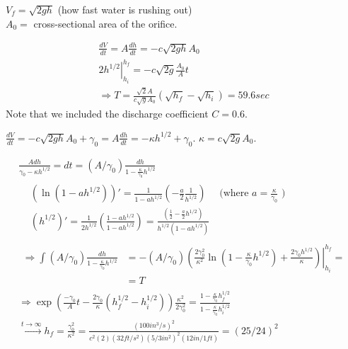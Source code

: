 \documentclass[twoside]{amsart}
\theoremstyle{plain}
\theoremstyle{definition}
\newcommand{\exercisehead}[1]
  {\smallskip
   \noindent{\small\bf Exercise #1.}}
\begin{document}
$V_f = \sqrt{ 2gh }$ (how fast water is rushing out) \medskip \\
$ A_0 = $ cross-sectional area of the orifice.  

\[
\begin{gathered}
  \frac{dV}{dt} = A \frac{dh}{dt} = -c\sqrt{ 2g h } A_0 \\
  \left. 2h^{1/2} \right|_{h_i}^{h_f} = -c\sqrt{ 2g } \frac{A_0}{A} t \\
  \Longrightarrow T = \frac{ \sqrt{2} A}{ c \sqrt{ g} A_0 } \left( \sqrt{ h_f} - \sqrt{ h_i} \right) = 59.6 sec
\end{gathered}
\]
Note that we included the discharge coefficient $C=0.6$.  

\exercisehead{19} $\frac{dV}{dt} = -c\sqrt{ 2gh} A_0 + \gamma_0 = A \frac{dh}{dt} = -\kappa h^{1/2} + \gamma_0$.   $\kappa = c \sqrt{2g} A_0$.  

\[
\begin{gathered}
\frac{ A dh}{ \gamma_0 - \kappa h^{1/2}} = dt = (A/\gamma_0) \frac{ dh}{ 1 - \frac{ \kappa}{\gamma_0} h^{1/2} }  \\
\begin{aligned}
  & \left( \ln{ \left( 1 - a h^{1/2} \right)} \right)' = \frac{1}{ 1 - a h^{1/2} } \left( - \frac{a}{2} \frac{1}{ h^{1/2} } \right) \quad \text{ (where $a = \frac{ \kappa}{\gamma_0} $ ) } \\
  & (h^{1/2})'  = \frac{1}{2h^{1/2}} \left( \frac{ 1 - a h^{1/2}  }{  1 - a h^{1/2} } \right) = \frac{ \left( \frac{1}{2} - \frac{a}{2} h^{1/2} \right)}{ h^{1/2} \left( 1 - a h^{1/2} \right) } 
\end{aligned} \\
\begin{aligned}
  \Longrightarrow \int (A/\gamma_0) \frac{ dh}{ 1 - \frac{\kappa}{ \gamma_0} h^{1/2} } & = - \left. (A/\gamma_0) \left( \frac{ 2 \gamma_0^2 }{ \kappa^2 } \ln{ \left( 1 - \frac{\kappa}{\gamma_0} h^{1/2} \right) } + \frac{ 2 \gamma_0 h^{1/2}}{ \kappa} \right) \right|_{h_i}^{h_f} = \\
    & = T 
\end{aligned} \\
\Longrightarrow \exp{ \left( \frac{-\gamma_0}{A} t - \frac{2\gamma_0}{\kappa} \left( h_f^{1/2} - h_i^{1/2} \right) \right)} \frac{\kappa^2}{ 2\gamma_0^2} = \frac{  1 - \frac{\kappa}{\gamma_0} h_f^{1/2} }{  1 - \frac{\kappa}{\gamma_0}  h_i^{1/2} } \\
  \xrightarrow{ t \to \infty } h_f = \frac{ \gamma_0^2}{ \kappa^2} = \frac{ (100 in^3/s)^2}{ c^2 (2) (32 ft/s^2) (5/3 in^2 )^2 (12in /1ft) }  = \left( 25/24 \right)^2
\end{gathered}
\]
\end{document}
